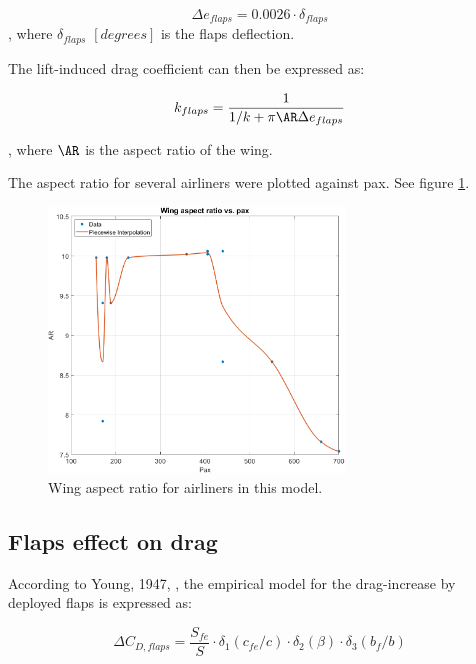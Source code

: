 \documentclass[english]{kththesis}
\begin{document}
\begin{equation}
\label{eq:eflaps}
\Delta e_{flaps} = 0.0026 \cdot \delta_{flaps}
\end{equation}
, where $\delta_{flaps}$ $[degrees]$ is the flaps deflection.

The lift-induced drag coefficient can then be expressed as:

\begin{equation}
\label{eq:kflaps}
k_{flaps} = \frac{1}{1/k + \pi \AR \Delta e_{flaps}}
\end{equation}

, where $\AR$ is the aspect ratio of the wing.

The aspect ratio for several airliners were plotted against pax. See figure \ref{fig:ARvsPax}. 
\begin{figure}[hb]
    \centering
    \includegraphics[width=0.7\textwidth]{Epictures/ARvsPax.png}
    \caption{Wing aspect ratio for airliners in this model.}
    \label{fig:ARvsPax}
\end{figure}




\subsection{Flaps effect on drag}
\label{sec:flapsondrag}

According to Young, 1947, \cite{Young1947}, the empirical model for the drag-increase by deployed flaps is expressed as:
 
\begin{equation}
\label{eq:dCDflapsYoung}
\Delta C_{D,flaps} = \frac{S_{fe}}{S} \cdot \delta_1(c_{fe}/c) \cdot \delta_2(\beta) \cdot \delta_3(b_{f}/b)
\end{equation}
\end{document}
